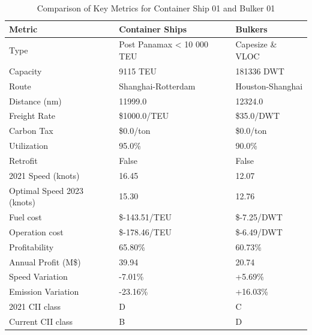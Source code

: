 \documentclass[a4paper,12pt]{article}
\begin{document}
\begin{table}[H]
	\caption{Comparison of Key Metrics for Container Ship 01 and Bulker 01}
	\centering
	\begin{tabular}{l|l|l}
		\hline
		\textbf{Metric}            & \textbf{Container Ships}  & \textbf{Bulkers} \\
		\hline
		Type                       & Post Panamax < 10 000 TEU & Capesize \& VLOC \\
		Capacity                   & 9115 TEU                  & 181336 DWT       \\
		Route                      & Shanghai-Rotterdam        & Houston-Shanghai \\
		Distance (nm)              & 11999.0                   & 12324.0          \\
		Freight Rate               & \$1000.0/TEU              & \$35.0/DWT       \\
		Carbon Tax                 & \$0.0/ton                 & \$0.0/ton        \\
		Utilization                & 95.0\%                    & 90.0\%           \\
		Retrofit                   & False                     & False            \\
		2021 Speed (knots)         & 16.45                     & 12.07            \\
		Optimal Speed 2023 (knots) & 15.30                     & 12.76            \\
		Fuel cost                  & \$-143.51/TEU             & \$-7.25/DWT      \\
		Operation cost             & \$-178.46/TEU             & \$-6.49/DWT      \\
		Profitability              & 65.80\%                   & 60.73\%          \\
		Annual Profit (M\$)        & 39.94                     & 20.74            \\
		Speed Variation            & -7.01\%                   & +5.69\%          \\
		Emission Variation         & -23.16\%                  & +16.03\%         \\
		2021 CII class             & D                         & C                \\
		Current CII class          & B                         & D                \\
		\hline
	\end{tabular}
	\label{table:comparison}
\end{table}
\end{document}
